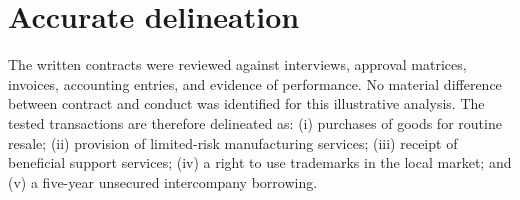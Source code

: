\section{Accurate delineation}
The written contracts were reviewed against interviews, approval matrices,
invoices, accounting entries, and evidence of performance. No material
difference between contract and conduct was identified for this illustrative
analysis. The tested transactions are therefore delineated as: (i) purchases of
goods for routine resale; (ii) provision of limited-risk manufacturing services;
(iii) receipt of beneficial support services; (iv) a right to use trademarks in
the local market; and (v) a five-year unsecured intercompany borrowing.

